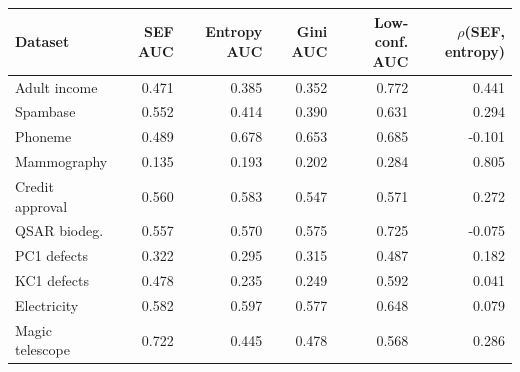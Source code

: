 \begin{tabular}{lrrrrr}
\toprule
Dataset & SEF AUC & Entropy AUC & Gini AUC & Low-conf. AUC & $\rho$(SEF, entropy) \\
\midrule
Adult income & 0.471 & 0.385 & 0.352 & 0.772 & 0.441 \\
Spambase & 0.552 & 0.414 & 0.390 & 0.631 & 0.294 \\
Phoneme & 0.489 & 0.678 & 0.653 & 0.685 & -0.101 \\
Mammography & 0.135 & 0.193 & 0.202 & 0.284 & 0.805 \\
Credit approval & 0.560 & 0.583 & 0.547 & 0.571 & 0.272 \\
QSAR biodeg. & 0.557 & 0.570 & 0.575 & 0.725 & -0.075 \\
PC1 defects & 0.322 & 0.295 & 0.315 & 0.487 & 0.182 \\
KC1 defects & 0.478 & 0.235 & 0.249 & 0.592 & 0.041 \\
Electricity & 0.582 & 0.597 & 0.577 & 0.648 & 0.079 \\
Magic telescope & 0.722 & 0.445 & 0.478 & 0.568 & 0.286 \\
\bottomrule
\end{tabular}
